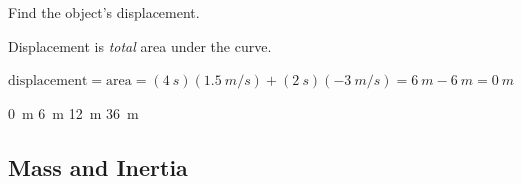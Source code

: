 \documentclass[]{exam}
\begin{document}
\begin{questions}
Find the object's displacement.

\ifprintanswers
{\color{red}
Displacement is \textit{total} area under the curve.

$\displaystyle \text{displacement} = \text{area} = (\SI{4}{s})(\SI{1.5}{m/s}) + (\SI{2}{s})(\SI{-3}{m/s}) = \SI{6}{m} - \SI{6}{m} = \boxed{\SI{0}{m}}$
}
\fi

\begin{randomizechoices}
    \correctchoice \SI{0}{m}
    \choice \SI{6}{m}
    \choice \SI{12}{m}
    \choice \SI{36}{m}
\end{randomizechoices}

\end{questions}
    


\clearpage

\subsection{Mass and Inertia}


\end{document}
